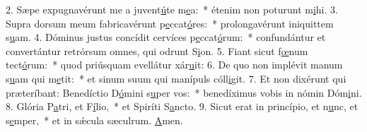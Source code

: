 2. Sæpe expugnavérunt me a juvent\uline{ú}te m\uline{e}a:~* étenim non poturunt m\uline{i}hi.
3. Supra dorsum meum fabricavérunt p\uline{e}ccat\uline{ó}res:~* prolongavérunt iniquittem s\uline{u}am.
4. Dóminus justus concídit cervíces p\uline{e}ccat\uline{ó}rum:~* confundántur et convertántur retrórsum omnes, qui odrunt S\uline{i}on.
5. Fiant sicut f\uline{œ}num tect\uline{ó}rum:~* quod priúsquam evellátur xár\uline{u}it:
6. De quo non implévit manum s\uline{u}am qui m\uline{e}tit:~* et sinum suum qui manípuls cóll\uline{i}git.
7. Et non dixérunt qui præteríbant: Benedíctio D\uline{ó}mini s\uline{u}per vos:~* benedíximus vobis in nómin Dóm\uline{i}ni.
8. Glória P\uline{a}tri, et F\uline{í}lio,~* et Spiríti S\uline{a}ncto.
9. Sicut erat in princípio, et n\uline{u}nc, et s\uline{e}mper,~* et in sǽcula sæculrum. \uline{A}men.
